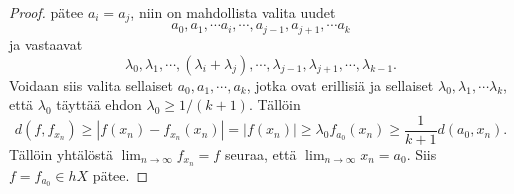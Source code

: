 \documentclass[12pt,a4paper,leqno]{report}
\newcommand{\N}{\mathbb{N}}
\theoremstyle{plain}
\newtheorem{lause}[equation]{Lause}
\theoremstyle{definition}
\theoremstyle{remark}
\begin{document}
\begin{proof}
pätee $ a_i=a_j$, niin on mahdollista valita uudet $$a_0,a_1,\cdots a_i,\cdots, a_{j-1},a_{j+1},\cdots a_{k}$$ ja vastaavat $$\lambda_0,\lambda_1,\cdots, (\lambda_i+\lambda_j),\cdots ,
\lambda_{j-1},
\lambda_{j+1},\cdots, \lambda_{k-1}.$$ 
Voidaan siis valita sellaiset $a_0,a_1,\cdots, a_k$, jotka ovat erillisiä ja sellaiset $\lambda_0,\lambda_1,\cdots \lambda_k$, että $\lambda_0$ täyttää ehdon $\lambda_0\geq 1/(k+1)$. Tällöin $$d(f,f_{x_n})\geq |f(x_n)-f_{x_n}(x_n)|=|f(x_n)|\geq \lambda_0 f_{a_0}(x_n)\geq \dfrac{1}{k+1}d(a_0,x_n).$$
Tällöin yhtälöstä $\lim_{n\rightarrow\infty} f_{x_n}=f$ seuraa, että $\lim_{n\rightarrow\infty }x_n=a_0$. Siis $ f=f_{a_0}\in hX$ pätee.

\end{proof}


%
%
%
%
%
%
%
%
%
%
%
%
%
%
%
%
%
\end{document}
